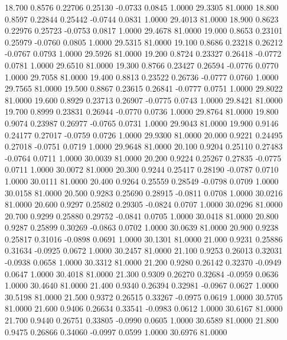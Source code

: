   18.700   0.8576   0.22706   0.25130  -0.0733   0.0845   1.0000  29.3305  81.0000
  18.800   0.8597   0.22844   0.25442  -0.0744   0.0831   1.0000  29.4013  81.0000
  18.900   0.8623   0.22976   0.25723  -0.0753   0.0817   1.0000  29.4678  81.0000
  19.000   0.8653   0.23101   0.25979  -0.0760   0.0805   1.0000  29.5315  81.0000
  19.100   0.8686   0.23218   0.26212  -0.0767   0.0793   1.0000  29.5926  81.0000
  19.200   0.8724   0.23327   0.26418  -0.0772   0.0781   1.0000  29.6510  81.0000
  19.300   0.8766   0.23427   0.26594  -0.0776   0.0770   1.0000  29.7058  81.0000
  19.400   0.8813   0.23522   0.26736  -0.0777   0.0760   1.0000  29.7565  81.0000
  19.500   0.8867   0.23615   0.26841  -0.0777   0.0751   1.0000  29.8022  81.0000
  19.600   0.8929   0.23713   0.26907  -0.0775   0.0743   1.0000  29.8421  81.0000
  19.700   0.8999   0.23831   0.26944  -0.0770   0.0736   1.0000  29.8764  81.0000
  19.800   0.9074   0.23987   0.26977  -0.0765   0.0731   1.0000  29.9043  81.0000
  19.900   0.9146   0.24177   0.27017  -0.0759   0.0726   1.0000  29.9300  81.0000
  20.000   0.9221   0.24495   0.27018  -0.0751   0.0719   1.0000  29.9648  81.0000
  20.100   0.9204   0.25110   0.27483  -0.0764   0.0711   1.0000  30.0039  81.0000
  20.200   0.9224   0.25267   0.27835  -0.0775   0.0711   1.0000  30.0072  81.0000
  20.300   0.9244   0.25417   0.28190  -0.0787   0.0710   1.0000  30.0111  81.0000
  20.400   0.9264   0.25559   0.28549  -0.0798   0.0709   1.0000  30.0158  81.0000
  20.500   0.9283   0.25690   0.28915  -0.0811   0.0708   1.0000  30.0216  81.0000
  20.600   0.9297   0.25802   0.29305  -0.0824   0.0707   1.0000  30.0296  81.0000
  20.700   0.9299   0.25880   0.29752  -0.0841   0.0705   1.0000  30.0418  81.0000
  20.800   0.9287   0.25899   0.30269  -0.0863   0.0702   1.0000  30.0639  81.0000
  20.900   0.9238   0.25817   0.31016  -0.0898   0.0691   1.0000  30.1301  81.0000
  21.000   0.9231   0.25886   0.31634  -0.0925   0.0672   1.0000  30.2457  81.0000
  21.100   0.9253   0.26013   0.32031  -0.0938   0.0658   1.0000  30.3312  81.0000
  21.200   0.9280   0.26142   0.32370  -0.0949   0.0647   1.0000  30.4018  81.0000
  21.300   0.9309   0.26270   0.32684  -0.0959   0.0636   1.0000  30.4640  81.0000
  21.400   0.9340   0.26394   0.32981  -0.0967   0.0627   1.0000  30.5198  81.0000
  21.500   0.9372   0.26515   0.33267  -0.0975   0.0619   1.0000  30.5705  81.0000
  21.600   0.9406   0.26634   0.33541  -0.0983   0.0612   1.0000  30.6167  81.0000
  21.700   0.9440   0.26751   0.33805  -0.0990   0.0605   1.0000  30.6589  81.0000
  21.800   0.9475   0.26866   0.34060  -0.0997   0.0599   1.0000  30.6976  81.0000
